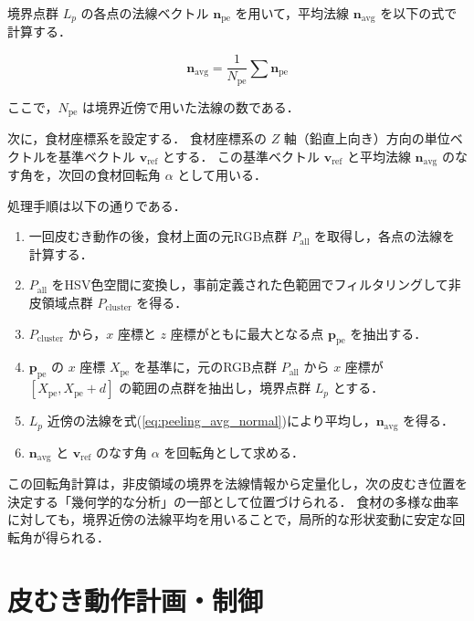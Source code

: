 境界点群 $L_p$ の各点の法線ベクトル $\mathbf{n}_{\mathrm{pe}}$ を用いて，平均法線 $\mathbf{n}_{\mathrm{avg}}$ を以下の式で計算する．

\begin{equation}
  \mathbf{n}_{\mathrm{avg}} = \frac{1}{N_{\mathrm{pe}}} \sum \mathbf{n}_{\mathrm{pe}}
  \label{eq:peeling_avg_normal}
\end{equation}

ここで，$N_{\mathrm{pe}}$ は境界近傍で用いた法線の数である．

次に，食材座標系を設定する．
食材座標系の $Z$ 軸（鉛直上向き）方向の単位ベクトルを基準ベクトル $\mathbf{v}_{\mathrm{ref}}$ とする．
この基準ベクトル $\mathbf{v}_{\mathrm{ref}}$ と平均法線 $\mathbf{n}_{\mathrm{avg}}$ のなす角を，次回の食材回転角 $\alpha$ として用いる．


処理手順は以下の通りである．

\begin{enumerate}
  \item 一回皮むき動作の後，食材上面の元RGB点群 $P_{\mathrm{all}}$ を取得し，各点の法線を計算する．
  \item $P_{\mathrm{all}}$ をHSV色空間に変換し，事前定義された色範囲でフィルタリングして非皮領域点群 $P_{\mathrm{cluster}}$ を得る．
  \item $P_{\mathrm{cluster}}$ から，$x$ 座標と $z$ 座標がともに最大となる点 $\mathbf{p}_{\mathrm{pe}}$ を抽出する．
  \item $\mathbf{p}_{\mathrm{pe}}$ の $x$ 座標 $X_{\mathrm{pe}}$ を基準に，{元のRGB点群 $P_{\mathrm{all}}$} から $x$ 座標が $[X_{\mathrm{pe}}, X_{\mathrm{pe}} + d]$ の範囲の点群を抽出し，境界点群 $L_p$ とする．
  \item $L_p$ 近傍の法線を式(\ref{eq:peeling_avg_normal})により平均し，$\mathbf{n}_{\mathrm{avg}}$ を得る．
  \item $\mathbf{n}_{\mathrm{avg}}$ と $\mathbf{v}_{\mathrm{ref}}$ のなす角 $\alpha$ を回転角として求める．
\end{enumerate}

この回転角計算は，非皮領域の境界を法線情報から定量化し，次の皮むき位置を決定する「幾何学的な分析」の一部として位置づけられる．
食材の多様な曲率に対しても，境界近傍の法線平均を用いることで，局所的な形状変動に安定な回転角が得られる．

\section{皮むき動作計画・制御}
\label{sec:peeling_phase_motion}

